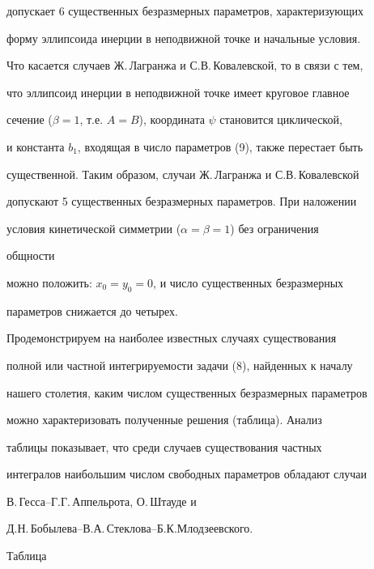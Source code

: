 допускает 6 существенных безразмерных параметров, характеризующих


форму эллипсоида инерции в неподвижной точке и начальные условия.


Что касается случаев Ж.\,Лагранжа и С.В.\,Ковалевской, то в связи с тем,


что эллипсоид инерции в неподвижной точке имеет круговое главное


сечение ($\beta=1$, т.е. $A=B$), координата $\psi$ становится циклической,


и константа $b_1$, входящая в число параметров (9), также перестает быть


существенной. Таким образом, случаи Ж.\,Лагранжа и С.В.\,Ковалевской


допускают 5 существенных безразмерных параметров. При наложении


условия кинетической симметрии ($\alpha=\beta=1$) без ограничения


общности


можно положить: $x_0=y_0=0$, и число существенных безразмерных


параметров снижается до четырех.





Продемонстрируем на наиболее известных случаях существования


полной или частной интегрируемости задачи (8), найденных к началу


нашего столетия, каким числом существенных безразмерных параметров


можно характеризовать полученные решения (таблица). Анализ


таблицы показывает, что среди случаев существования частных


интегралов наибольшим числом свободных параметров обладают случаи


В.\,Гесса--Г.Г.\,Аппельрота, О.\,Штауде и


Д.Н.\,Бобылева--В.А.\,Стеклова--Б.К.Млодзеевского.


\medskip





{\hspace{12cm} Таблица}


\smallskip





